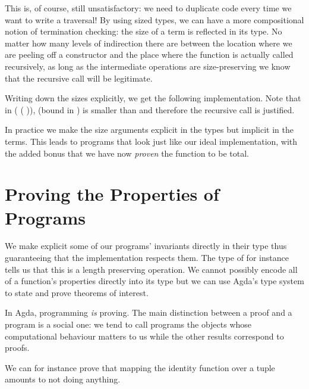 
This is, of course, still unsatisfactory: we need to duplicate code every
time we want to write a traversal! By using sized types, we can have a more
compositional notion of termination checking: the size of a term is reflected
in its type. No matter how many levels of indirection there are between the
location where we are peeling off a constructor and the place where the function
is actually called recursively, as long as the intermediate operations are
size-preserving we know that the recursive call will be legitimate.

Writing down the sizes explicitly, we get the following implementation. Note
that in ( (  )),
 (bound in ) is smaller than  and therefore the recursive
call is justified.


In practice we make the size arguments explicit in the types but implicit in the
terms. This leads to programs that look just like our ideal implementation, with
the added bonus that we have now \emph{proven} the function to be total.


\section{Proving the Properties of Programs}
\label{sec:intro-proving}
We make explicit some of our programs' invariants directly in their
type thus guaranteeing that the implementation respects them. The
type of  for instance tells us that
this is a length preserving operation. We cannot possibly encode all
of a function's properties directly into its type but we can use
Agda's type system to state and prove theorems of interest.

In Agda, programming \emph{is} proving. The main distinction between
a proof and a program is a social one: we tend to call programs the
objects whose computational behaviour matters to us while the other
results correspond to proofs.

We can for instance prove that mapping the identity function over a
tuple amounts to not doing anything.

